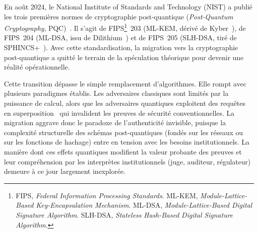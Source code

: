 \begin{sloppypar}
En ao\^ut 2024, le National Institute of Standards and Technology (NIST) a publi\'e les trois premi\`eres normes de cryptographie post-quantique (\emph{Post-Quantum Cryptography}, PQC)~\cite{NISTPQC,Alagic2020,NISTPostQuantum2022}. Il s'agit de FIPS\footnote{FIPS, \emph{Federal Information Processing Standards}. ML-KEM, \emph{Module-Lattice-Based Key-Encapsulation Mechanism}. ML-DSA, \emph{Module-Lattice-Based Digital Signature Algorithm}. SLH-DSA, \emph{Stateless Hash-Based Digital Signature Algorithm}.}~203 (ML-KEM, d\'eriv\'e de Kyber~\cite{Kyber2022}), de FIPS~204 (ML-DSA, issu de Dilithium~\cite{Dilithium2022}) et de FIPS~205 (SLH-DSA, tir\'e de SPHINCS+~\cite{SPHINCS2022}). Avec cette standardisation, la migration vers la cryptographie post-quantique a quitt\'e le terrain de la sp\'eculation th\'eorique pour devenir une r\'ealit\'e op\'erationnelle.

Cette transition d\'epasse le simple remplacement d'algorithmes. Elle rompt avec plusieurs paradigmes \'etablis. Les adversaires classiques sont limit\'es par la puissance de calcul, alors que les adversaires quantiques exploitent des requ\^etes en superposition~\cite{Boneh2011,Watrous2009} qui invalident les preuves de s\'ecurit\'e conventionnelles. La migration aggrave donc le paradoxe de l'authenticit\'e invisible, puisque la complexit\'e structurelle des sch\'emas post-quantiques (fond\'es sur les r\'eseaux ou sur les fonctions de hachage) entre en tension avec les besoins institutionnels. La mani\`ere dont ces effets quantiques modifient la valeur probante des preuves et leur compr\'ehension par les interpr\`etes institutionnels (juge, auditeur, r\'egulateur) demeure \`a ce jour largement inexplor\'ee.

\end{sloppypar}

